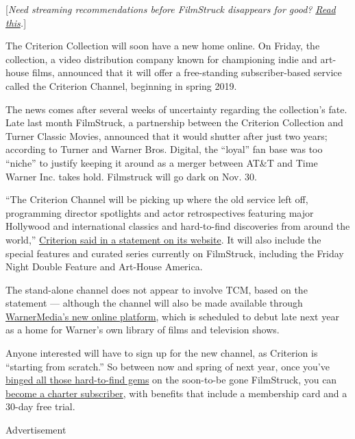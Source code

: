 {[}\emph{Need streaming recommendations before FilmStruck disappears for
good?}
\href{https://www.nytimes3xbfgragh.onion/2018/10/29/movies/filmstruck-closing-best-movies.html}{\emph{Read
this}}\emph{.}{]}

The Criterion Collection will soon have a new home online. On Friday,
the collection, a video distribution company known for championing indie
and art-house films, announced that it will offer a free-standing
subscriber-based service called the Criterion Channel, beginning in
spring 2019.

The news comes after several weeks of uncertainty regarding the
collection's fate. Late last month FilmStruck, a partnership between the
Criterion Collection and Turner Classic Movies, announced that it would
shutter after just two years; according to Turner and Warner Bros.
Digital, the ``loyal'' fan base was too ``niche'' to justify keeping it
around as a merger between AT\&T and Time Warner Inc. takes hold.
Filmstruck will go dark on Nov. 30.

``The Criterion Channel will be picking up where the old service left
off, programming director spotlights and actor retrospectives featuring
major Hollywood and international classics and hard-to-find discoveries
from around the world,''
\href{https://www.criterion.com/current/posts/6044-new-independent-criterion-channel-to-launch-spring-2019}{Criterion
said in a statement on its website}. It will also include the special
features and curated series currently on FilmStruck, including the
Friday Night Double Feature and Art-House America.

The stand-alone channel does not appear to involve TCM, based on the
statement --- although the channel will also be made available through
\href{https://www.nytimes3xbfgragh.onion/2018/10/10/business/media/warner-media-streaming.html}{WarnerMedia's
new online platform}, which is scheduled to debut late next year as a
home for Warner's own library of films and television shows.

Anyone interested will have to sign up for the new channel, as Criterion
is ``starting from scratch.'' So between now and spring of next year,
once you've
\href{https://www.nytimes3xbfgragh.onion/2018/10/29/movies/filmstruck-closing-best-movies.html}{binged
all those hard-to-find gems} on the soon-to-be gone FilmStruck, you can
\href{https://www.criterion.com/channel}{become a charter subscriber},
with benefits that include a membership card and a 30-day free trial.

Advertisement

